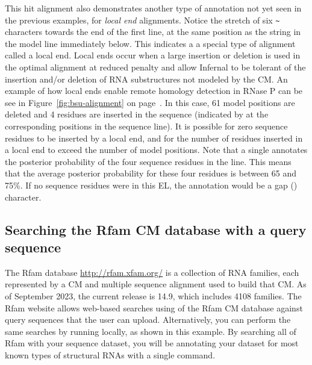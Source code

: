 This hit alignment also demonstrates another type of annotation not
yet seen in the previous examples, for \emph{local end}
alignments. Notice the stretch of six \verb+~+ characters towards the
end of the first  line, at the same position as the string
\otext{*[61]*} in the model line immediately below. This indicates a a
special type of alignment called a local end. Local ends occur when a
large insertion or deletion is used in the optimal alignment at
reduced penalty \citep{KleinEddy03} and allow Infernal to be tolerant
of the insertion and/or deletion of RNA substructures not modeled by
the CM. An example of how local ends enable remote homology detection
in RNase P can be see in Figure~\ref{fig:bsu-alignment} on
page~\pageref{fig:bsu-alignment}. In this case, 61 model positions are
deleted and 4 residues are inserted in the sequence (indicated by
\otext{*[ 4]*} at the corresponding positions in the sequence line).
It is possible for zero sequence residues to be inserted by a local
end, and for the number of residues inserted in a local end to exceed
the number of model positions. Note that a single  annotates
the posterior probability of the four sequence residues in the
 line. This means that the average posterior probability for
these four residues is between 65 and 75\%. If no sequence residues
were in this EL, the  annotation would be a gap ()
character.

\subsection{Searching the Rfam CM database with a query sequence}

The Rfam database \url{http://rfam.xfam.org/} is a collection
of RNA families, each represented by a CM and multiple sequence
alignment used to build that CM. As of September 2023, the current release
is 14.9, which includes 4108 families. The Rfam website allows
web-based searches using  of the Rfam CM database against
query sequences that the user can upload. Alternatively, you can perform
the same searches by running  locally, as shown in this
example. By searching all of Rfam with your sequence dataset, you will
be annotating your dataset for most known types of structural RNAs
with a single command.

